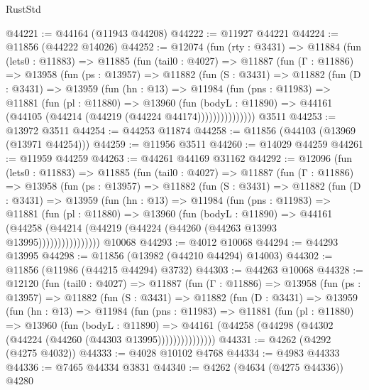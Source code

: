 \begin{lexlean}{RustStd}
\begin{coremodule}
@44221 := @44164 (@11943 @44208)
@44222 := @11927 @44221
@44224 := @11856 (@44222 @14026)
@44252 := @12074
    (fun (rty : @3431) =>
    @11884
      (fun (lets0 : @11883) =>
      @11885
        (fun (tail0 : @4027) =>
        @11887
          (fun (Γ : @11886) =>
          @13958
            (fun (ps : @13957) =>
            @11882
              (fun (S : @3431) =>
              @11882
                (fun (D : @3431) =>
                @13959
                  (fun (hn : @13) =>
                  @11984
                    (fun (pns : @11983) =>
                    @11881
                      (fun (pl : @11880) =>
                      @13960
                        (fun (bodyL : @11890) =>
                        @44161 (@44105 (@44214 (@44219 (@44224 @44174)))))))))))))))
    @3511
@44253 := @13972 @3511
@44254 := @44253 @11874
@44258 := @11856 (@44103 (@13969 (@13971 @44254)))
@44259 := @11956 @3511
@44260 := @14029 @44259
@44261 := @11959 @44259
@44263 := @44261 @44169 @31162
@44292 := @12096
    (fun (lets0 : @11883) =>
    @11885
      (fun (tail0 : @4027) =>
      @11887
        (fun (Γ : @11886) =>
        @13958
          (fun (ps : @13957) =>
          @11882
            (fun (S : @3431) =>
            @11882
              (fun (D : @3431) =>
              @13959
                (fun (hn : @13) =>
                @11984
                  (fun (pns : @11983) =>
                  @11881
                    (fun (pl : @11880) =>
                    @13960
                      (fun (bodyL : @11890) =>
                      @44161
                        (@44258
                          (@44214 (@44219 (@44224 (@44260 (@44263 @13993 @13995))))))))))))))))
    @10068
@44293 := @4012 @10068
@44294 := @44293 @13995
@44298 := @11856 (@13982 (@44210 @44294) @14003)
@44302 := @11856 (@11986 (@44215 @44294) @3732)
@44303 := @44263 @10068
@44328 := @12120
    (fun (tail0 : @4027) =>
    @11887
      (fun (Γ : @11886) =>
      @13958
        (fun (ps : @13957) =>
        @11882
          (fun (S : @3431) =>
          @11882
            (fun (D : @3431) =>
            @13959
              (fun (hn : @13) =>
              @11984
                (fun (pns : @11983) =>
                @11881
                  (fun (pl : @11880) =>
                  @13960
                    (fun (bodyL : @11890) =>
                    @44161 (@44258 (@44298 (@44302 (@44224 (@44260 (@44303 @13995)))))))))))))))
@44331 := @4262 (@4292 (@4275 @4032))
@44333 := @4028 @10102 @4768
@44334 := @4983 @44333
@44336 := @7465 @44334 @3831
@44340 := @4262 (@4634 (@4275 @44336)) @4280

\end{coremodule}
\end{lexlean}
